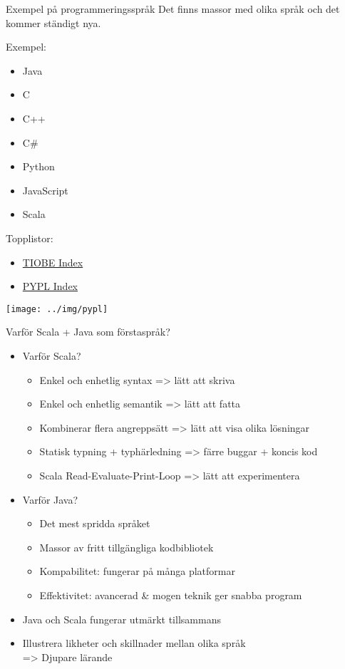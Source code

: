 \begin{Slide}{Exempel på programmeringsspråk}
Det finns massor med olika språk och det kommer ständigt nya. 
\vspace{1em}
\begin{multicols}{2}
Exempel:
\begin{itemize}
\item Java
\item C
\item C++
\item C\#
\item Python
\item JavaScript
\item Scala
\end{itemize}

\columnbreak %

Topplistor:
\begin{itemize}
\item \href{http://www.tiobe.com/index.php/content/paperinfo/tpci/index.html}{TIOBE Index}
\item \href{http://pypl.github.io/PYPL.html}{PYPL Index}
\end{itemize}
\vspace{1em}
\texttt{[image: ../img/pypl]}
\end{multicols}

\end{Slide}

\begin{Slide}{Varför Scala + Java som förstaspråk?}
\begin{itemize}
\item Varför Scala?
\begin{itemize}
\item Enkel och enhetlig syntax => lätt att skriva
\item Enkel och enhetlig semantik => lätt att fatta 
\item Kombinerar flera angreppsätt => lätt att visa olika lösningar
\item Statisk typning + typhärledning =>  färre buggar + koncis kod
\item Scala Read-Evaluate-Print-Loop => lätt att experimentera
\end{itemize}

\item Varför Java?
\begin{itemize}
\item Det mest spridda språket
\item Massor av fritt tillgängliga kodbibliotek
\item Kompabilitet: fungerar på många platformar
\item Effektivitet: avancerad \& mogen teknik ger snabba program
\end{itemize}
\item Java och Scala fungerar utmärkt tillsammans
\item Illustrera likheter och skillnader mellan olika språk \\ => Djupare lärande
\end{itemize}
\end{Slide}

